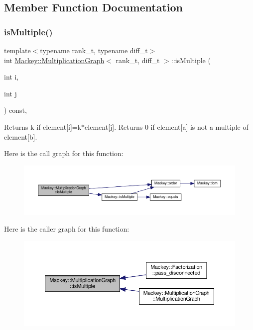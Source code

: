 \subsection{Member Function Documentation}
\mbox{\label{classMackey_1_1MultiplicationGraph_a6ac7e92d6ceb6bc146f855898916449f}} 
\subsubsection{\texorpdfstring{is\+Multiple()}{isMultiple()}}
{\footnotesize\ttfamily template$<$typename rank\+\_\+t, typename diff\+\_\+t$>$ \\
int \hyperlink{classMackey_1_1MultiplicationGraph}{Mackey\+::\+Multiplication\+Graph}$<$ rank\+\_\+t, diff\+\_\+t $>$\+::is\+Multiple (\begin{DoxyParamCaption}\item[{int}]{i,  }\item[{int}]{j }\end{DoxyParamCaption}) const\hspace{0.3cm}{\ttfamily [inline]}, {\ttfamily [protected]}}



Returns k if element\mbox{[}i\mbox{]}=k$\ast$element\mbox{[}j\mbox{]}. Returns 0 if element\mbox{[}a\mbox{]} is not a multiple of element\mbox{[}b\mbox{]}. 

Here is the call graph for this function\+:\nopagebreak
\begin{figure}[H]
\begin{center}
\leavevmode
\includegraphics[width=350pt]{classMackey_1_1MultiplicationGraph_a6ac7e92d6ceb6bc146f855898916449f_cgraph}
\end{center}
\end{figure}
Here is the caller graph for this function\+:\nopagebreak
\begin{figure}[H]
\begin{center}
\leavevmode
\includegraphics[width=350pt]{classMackey_1_1MultiplicationGraph_a6ac7e92d6ceb6bc146f855898916449f_icgraph}
\end{center}
\end{figure}


